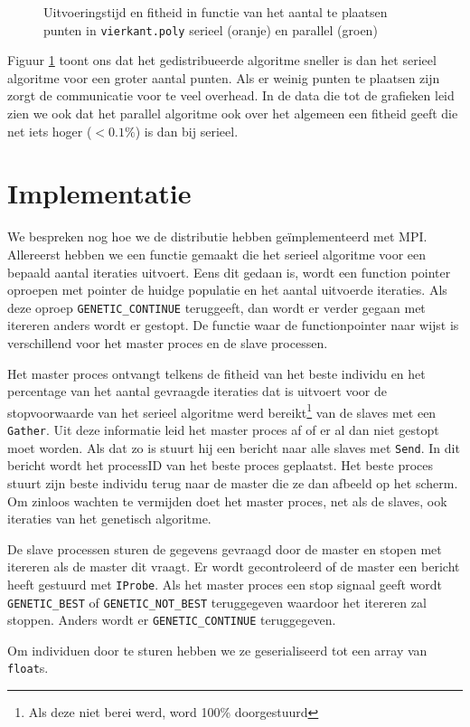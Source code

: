 \begin{figure}[H]

\caption{Uitvoeringstijd en fitheid in functie van het aantal te plaatsen punten in \texttt{vierkant.poly} serieel (oranje) en parallel (groen)}
\label{graf:perf}
\end{figure}

Figuur \ref{graf:perf} toont ons dat het gedistribueerde algoritme sneller is dan het serieel algoritme voor een groter aantal punten. Als er weinig punten te plaatsen zijn zorgt de communicatie voor te veel overhead. In de data die tot de grafieken leid zien we ook dat het parallel algoritme ook over het algemeen een fitheid geeft die net iets hoger ($< 0.1\%$) is dan bij serieel.


\section{Implementatie}
We bespreken nog hoe we de distributie hebben geïmplementeerd met MPI. Allereerst hebben we een functie gemaakt die het serieel algoritme voor een bepaald aantal iteraties uitvoert. Eens dit gedaan is, wordt een function pointer oproepen met pointer de huidge populatie en het aantal uitvoerde iteraties. Als deze oproep \texttt{GENETIC\_CONTINUE} teruggeeft, dan wordt er verder gegaan met itereren anders wordt er gestopt. De functie waar de functionpointer naar wijst is verschillend voor het master proces en de slave processen. 

Het master proces ontvangt telkens de fitheid van het beste individu en het percentage van het aantal gevraagde iteraties dat is uitvoert voor de stopvoorwaarde van het serieel algoritme werd bereikt\footnote{Als deze niet berei werd, word 100\% doorgestuurd} van de slaves met een \texttt{Gather}. Uit deze informatie leid het master proces af of er al dan niet gestopt moet worden. Als dat zo is stuurt hij een bericht naar alle slaves met \texttt{Send}. In dit bericht wordt het processID van het beste proces geplaatst. Het beste proces stuurt zijn beste individu terug naar de master die ze dan afbeeld op het scherm. Om zinloos wachten te vermijden doet het master proces, net als de slaves, ook iteraties van het genetisch algoritme.

De slave processen sturen de gegevens gevraagd door de master en stopen met itereren als de master dit vraagt. Er wordt gecontroleerd of de master een bericht heeft gestuurd met \texttt{IProbe}. Als het master proces een stop signaal geeft wordt \texttt{GENETIC\_BEST} of \texttt{GENETIC\_NOT\_BEST} teruggegeven waardoor het itereren zal stoppen. Anders wordt er \texttt{GENETIC\_CONTINUE} teruggegeven.

Om individuen door te sturen hebben we ze geserialiseerd tot een array van \texttt{float}s. 


%